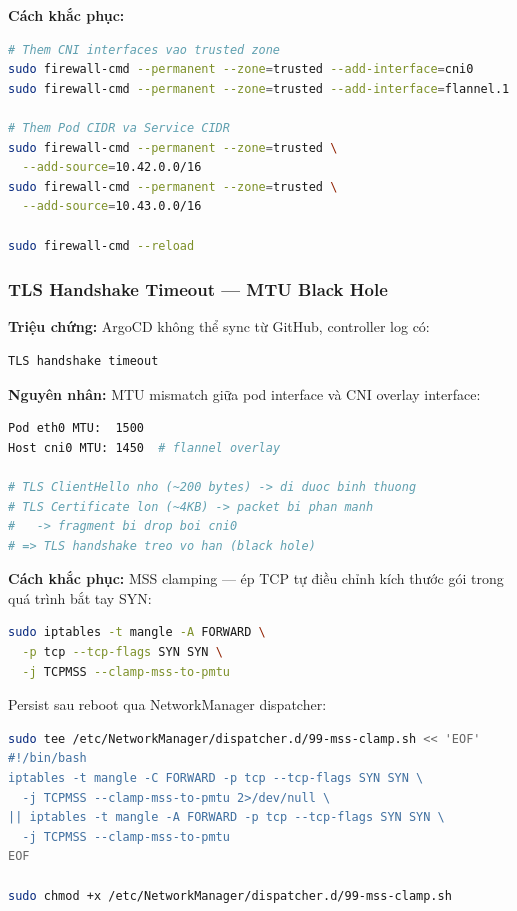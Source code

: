 \textbf{Cách khắc phục:}

\begin{lstlisting}[language=bash]
# Them CNI interfaces vao trusted zone
sudo firewall-cmd --permanent --zone=trusted --add-interface=cni0
sudo firewall-cmd --permanent --zone=trusted --add-interface=flannel.1

# Them Pod CIDR va Service CIDR
sudo firewall-cmd --permanent --zone=trusted \
  --add-source=10.42.0.0/16
sudo firewall-cmd --permanent --zone=trusted \
  --add-source=10.43.0.0/16

sudo firewall-cmd --reload
\end{lstlisting}

\subsubsection{TLS Handshake Timeout — MTU Black Hole}

\textbf{Triệu chứng:} ArgoCD không thể sync từ GitHub, controller log có:

\begin{lstlisting}[language=bash]
TLS handshake timeout
\end{lstlisting}

\textbf{Nguyên nhân:} MTU mismatch giữa pod interface và CNI overlay interface:

\begin{lstlisting}[language=bash]
Pod eth0 MTU:  1500
Host cni0 MTU: 1450  # flannel overlay

# TLS ClientHello nho (~200 bytes) -> di duoc binh thuong
# TLS Certificate lon (~4KB) -> packet bi phan manh
#   -> fragment bi drop boi cni0
# => TLS handshake treo vo han (black hole)
\end{lstlisting}

\textbf{Cách khắc phục:} MSS clamping — ép TCP tự điều chỉnh kích thước gói trong quá trình bắt tay SYN:

\begin{lstlisting}[language=bash]
sudo iptables -t mangle -A FORWARD \
  -p tcp --tcp-flags SYN SYN \
  -j TCPMSS --clamp-mss-to-pmtu
\end{lstlisting}

Persist sau reboot qua NetworkManager dispatcher:

\begin{lstlisting}[language=bash]
sudo tee /etc/NetworkManager/dispatcher.d/99-mss-clamp.sh << 'EOF'
#!/bin/bash
iptables -t mangle -C FORWARD -p tcp --tcp-flags SYN SYN \
  -j TCPMSS --clamp-mss-to-pmtu 2>/dev/null \
|| iptables -t mangle -A FORWARD -p tcp --tcp-flags SYN SYN \
  -j TCPMSS --clamp-mss-to-pmtu
EOF

sudo chmod +x /etc/NetworkManager/dispatcher.d/99-mss-clamp.sh
\end{lstlisting}

